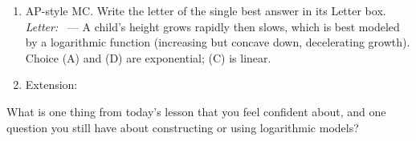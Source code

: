 \documentclass[10pt]{article}
\begin{document}
\begin{enumerate}[leftmargin=1.8em, itemsep=14pt]
\item AP-style MC. Write the letter of the single best answer in its Letter box. \textit{Letter:}~\gradedblank[id=hw5, type=choice, points=1, answer=B]{0.42in}{13pt} --- A child's height grows rapidly then slows, which is
      best modeled by a logarithmic function (increasing but concave down, decelerating
      growth). Choice (A) and (D) are exponential; (C) is linear.

\newpage
\item Extension:

      \rubricbox{\gradedblank[id=hw6, type=rubric, points=2,
  display={Change of base: $\log_{10}(x) = \dfrac{\ln x}{\ln 10}$, so $a\log_{10}(x) = \dfrac{1}{\ln 10}\cdot a\ln(x)$: $g$ is a vertical dilation of $f$ by $\dfrac{1}{\ln 10} \approx 0.4343$ (equivalently $f$ is $g$ stretched by $\ln 10 \approx 2.303$).}]{\linewidth}{42pt}}

\end{enumerate}

\vspace{0.12in}

\begin{reflectionbox}
What is one thing from today's lesson that you feel confident about, and one question you
still have about constructing or using logarithmic models?

\end{reflectionbox}
\end{document}
